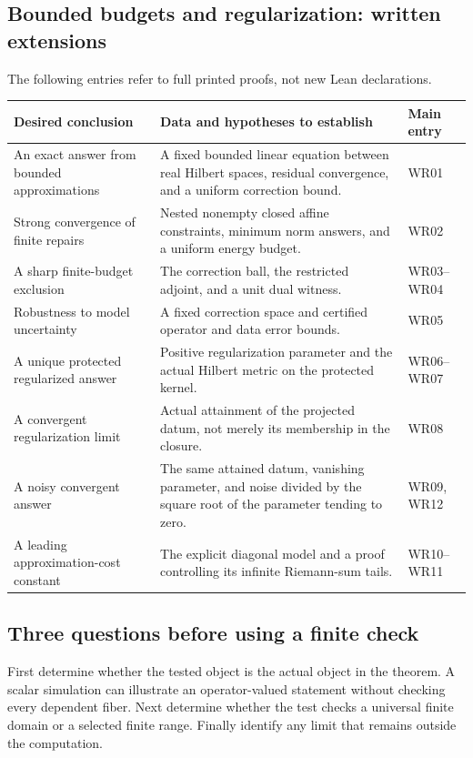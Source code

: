 \subsection{Bounded budgets and regularization: written extensions}
The following entries refer to full printed proofs, not new Lean declarations.
\begin{longtable}{@{}p{.24\linewidth}p{.48\linewidth}p{.21\linewidth}@{}}
\toprule Desired conclusion & Data and hypotheses to establish & Main entry\\\midrule\endhead
An exact answer from bounded approximations & A fixed bounded linear equation between real Hilbert spaces, residual convergence, and a uniform correction bound. & WR01\\[4pt]
Strong convergence of finite repairs & Nested nonempty closed affine constraints, minimum norm answers, and a uniform energy budget. & WR02\\[4pt]
A sharp finite-budget exclusion & The correction ball, the restricted adjoint, and a unit dual witness. & WR03--WR04\\[4pt]
Robustness to model uncertainty & A fixed correction space and certified operator and data error bounds. & WR05\\[4pt]
A unique protected regularized answer & Positive regularization parameter and the actual Hilbert metric on the protected kernel. & WR06--WR07\\[4pt]
A convergent regularization limit & Actual attainment of the projected datum, not merely its membership in the closure. & WR08\\[4pt]
A noisy convergent answer & The same attained datum, vanishing parameter, and noise divided by the square root of the parameter tending to zero. & WR09, WR12\\[4pt]
A leading approximation-cost constant & The explicit diagonal model and a proof controlling its infinite Riemann-sum tails. & WR10--WR11\\\bottomrule
\end{longtable}

\subsection{Three questions before using a finite check}
First determine whether the tested object is the actual object in the theorem. A scalar simulation can illustrate an operator-valued statement without checking every dependent fiber. Next determine whether the test checks a universal finite domain or a selected finite range. Finally identify any limit that remains outside the computation.


